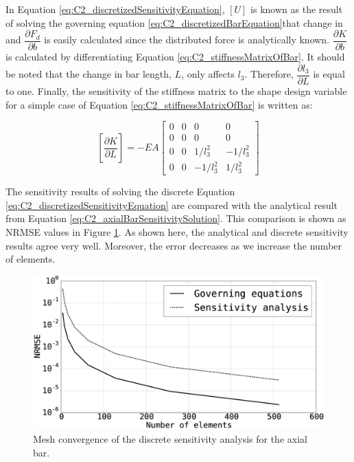 In Equation \eqref{eq:C2_discretizedSensitivityEquation}, $[U]$ is known as the result of solving the governing equation \eqref{eq:C2_discretizedBarEquation}that change in and $\dfrac{\partial F_d}{\partial b}$ is easily calculated since the distributed force is analytically known. $\dfrac{\partial K}{\partial b}$ is calculated by differentiating Equation \eqref{eq:C2_stiffnessMatrixOfBar}. It should be noted that the change in bar length, $L$, only affects $l_3$. Therefore, $\dfrac{\partial l_3}{\partial L}$ is equal to one. Finally, the sensitivity of the stiffness matrix to the shape design variable for a simple case of Equation \eqref{eq:C2_stiffnessMatrixOfBar} is written as:

\begin{equation}\label{eq:C2_sensitivityOfStiffnessMatrixOfBar}
    \left[ \frac{\partial K}{\partial L} \right] = 
    -EA
    \begin{bmatrix}
    0 & 0 & 0 & 0 \\
    0 & 0 & 0 & 0 \\
    0 & 0 & 1/l_3^2 & -1/l_3^2 \\
    0 & 0 & -1/l_3^2 & 1/l_3^2
    \end{bmatrix}
\end{equation}

The sensitivity results of solving the discrete Equation \eqref{eq:C2_discretizedSensitivityEquation} are compared with the analytical result from Equation \eqref{eq:C2_axialBarSensitivitySolution}. This comparison is shown as NRMSE values in Figure \ref{fig:C2_barDiscreteSensitivityAnalysis}. As shown here, the analytical and discrete sensitivity results agree very well. Moreover, the error decreases as we increase the number of elements.

\begin{figure}[h]
    \centering
    \includegraphics[width=14.00cm]{Chapter_2/figure/axial_bar_discrete_sensitivity_analysis.eps}
    \caption{Mesh convergence of the discrete sensitivity analysis for the axial bar.}
    \label{fig:C2_barDiscreteSensitivityAnalysis}
\end{figure}